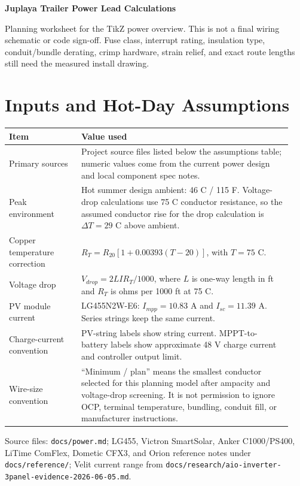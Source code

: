 \documentclass[10pt]{article}
\begin{document}
{\LARGE\bfseries Juplaya Trailer Power Lead Calculations}

{\small Planning worksheet for the TikZ power overview. This is not a final wiring schematic or code sign-off. Fuse class, interrupt rating, insulation type, conduit/bundle derating, crimp hardware, strain relief, and exact route lengths still need the measured install drawing.}

\section*{Inputs and Hot-Day Assumptions}

\begin{tabular}{@{}p{0.24\linewidth}p{0.70\linewidth}@{}}
\toprule
Item & Value used \\
\midrule
Primary sources & Project source files listed below the assumptions table; numeric values come from the current power design and local component spec notes. \\
Peak environment & Hot summer design ambient: 46 C / 115 F. Voltage-drop calculations use 75 C conductor resistance, so the assumed conductor rise for the drop calculation is \(\Delta T = 29\) C above ambient. \\
Copper temperature correction & \(R_T = R_{20}[1 + 0.00393(T-20)]\), with \(T=75\) C. \\
Voltage drop & \(V_{drop}=2LI R_T/1000\), where \(L\) is one-way length in ft and \(R_T\) is ohms per 1000 ft at 75 C. \\
PV module current & LG455N2W-E6: \(I_{mpp}=10.83\) A and \(I_{sc}=11.39\) A. Series strings keep the same current. \\
Charge-current convention & PV-string labels show string current. MPPT-to-battery labels show approximate 48 V charge current and controller output limit. \\
Wire-size convention & ``Minimum / plan'' means the smallest conductor selected for this planning model after ampacity and voltage-drop screening. It is not permission to ignore OCP, terminal temperature, bundling, conduit fill, or manufacturer instructions. \\
\bottomrule
\end{tabular}

{\footnotesize Source files: \texttt{docs/power.md}; LG455, Victron SmartSolar, Anker C1000/PS400, LiTime ComFlex, Dometic CFX3, and Orion reference notes under \texttt{docs/reference/}; Velit current range from \texttt{docs/research/aio-inverter-3panel-evidence-2026-06-05.md}.}
\end{document}
